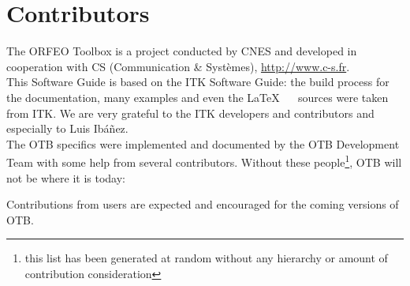 \chapter{Contributors}
\noindent

The ORFEO Toolbox is a project conducted by CNES and developed in
cooperation with CS (Communication \& Syst\`{e}mes), \url{http://www.c-s.fr}.\\

This Software Guide is based on the ITK Software Guide: the build
process for the documentation, many examples and even the \LaTeX~ ~
sources were taken from ITK. We are very grateful to the ITK
developers and contributors and especially to Luis Ib\'a\~nez.\\

The OTB specifics were implemented and documented by the OTB Development Team with some help from several contributors. Without these people\footnote{this list has been generated at random without any hierarchy or amount of contribution consideration}, OTB will not be where it is today:



Contributions from users are expected and encouraged for the coming
versions of OTB.

